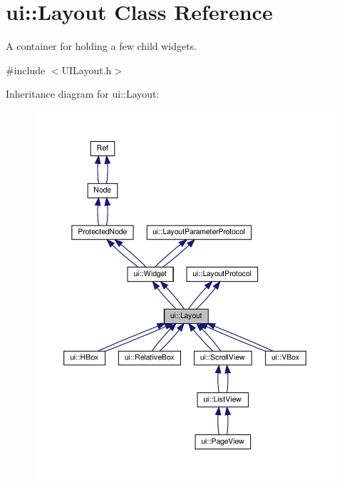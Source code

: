 \hypertarget{classui_1_1Layout}{}\section{ui\+:\+:Layout Class Reference}
\label{classui_1_1Layout}


A container for holding a few child widgets.  




{\ttfamily \#include $<$U\+I\+Layout.\+h$>$}



Inheritance diagram for ui\+:\+:Layout\+:
\nopagebreak
\begin{figure}[H]
\begin{center}
\leavevmode
\includegraphics[width=350pt]{classui_1_1Layout__inherit__graph}
\end{center}
\end{figure}


